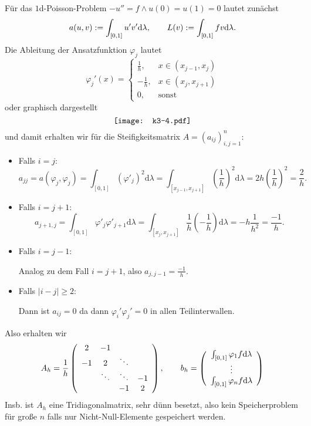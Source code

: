 \documentclass{book}
\newcommand{\assign}{:=}
\newcommand{\mathd}{\mathrm{d}}
\newenvironment{itemizedot}{\begin{itemize} \renewcommand{\labelitemi}{$\bullet$}\renewcommand{\labelitemii}{$\bullet$}\renewcommand{\labelitemiii}{$\bullet$}\renewcommand{\labelitemiv}{$\bullet$}}{\end{itemize}}
\begin{document}
F{\"u}r das $1$d-Poisson-Problem $- u'' = f \wedge u (0) = u (1) = 0$ lautet
zun{\"a}chst
\[ a (u, v) \assign \int_{[0, 1]} u' v' \mathd \lambda, \text{\qquad} L (v)
   \assign \int_{[0, 1]} f v \mathd \lambda . \]
{\hspace{1.7em}}Die Ableitung der Ansatzfunktion $\varphi_j$ lautet
\[ \varphi_j' (x) = \left\{\begin{array}{cc}
     \frac{1}{h}, & x \in (x_{j - 1}, x_j)\\
     - \frac{1}{h}, & x \in (x_j, x_{j + 1})\\
     0, & \text{sonst}
   \end{array}\right. \]
oder graphisch dargestellt
\[ 
   \raisebox{-0.00270170439554641\height}{\texttt{[image: k3-4.pdf]}}
\]
und damit erhalten wir f{\"u}r die Steifigkeitsmatrix $A = (a_{i j})_{i, j =
1}^n$:
\begin{itemizedot}
  \item Falls $i = j$:
  \[ a_{j j} = a (\varphi_j, \varphi_j) = \int_{[0, 1]} (\varphi'_j)^2 \mathd
     \lambda = \int_{[x_{j - 1}, x_{j + 1}]} \left( \frac{1}{h} \right)^2
     \mathd \lambda = 2 h \left( \frac{1}{h} \right)^2 = \frac{2}{h} . \]
  \item Falls $i = j + 1$:
  \[ a_{j + 1, j} = \int_{[0, 1]} \varphi'_j {\varphi'_{j + 1}}  \mathd
     \lambda = \int_{[x_j, x_{j + 1}]} \frac{1}{h} \left( - \frac{1}{h}
     \right) \mathd \lambda = - h \frac{1}{h^2}  = \frac{- 1}{h} . \]
  \item Falls $i = j - 1$:
  
  Analog zu dem Fall $i = j + 1$, also $a_{j, j - 1} = \frac{- 1}{h}$.
  
  \item Falls $| i - j | \geqslant 2$:
  
  Dann ist $a_{i j} = 0$ da dann $\varphi_i' \varphi_j' = 0$ in allen
  Teilinterwallen. 
\end{itemizedot}
Also erhalten wir
\[ A_h = \frac{1}{h} \left(\begin{array}{cccc}
     2 & - 1 &  & \\
     - 1 & 2 & \ddots & \\
     & \ddots & \ddots & - 1\\
     &  & - 1 & 2
   \end{array}\right), \text{\qquad} b_h = \left(\begin{array}{c}
     \int_{[0, 1]} \varphi_1 f \mathd \lambda\\
     \vdots\\
     \int_{[0, 1]} \varphi_n f \mathd \lambda
   \end{array}\right) \]
{\hspace{1.7em}}Insb. ist $A_h$ eine Tridiagonalmatrix, sehr d{\"u}nn besetzt,
also kein Speicherproblem f{\"u}r gro{\ss}e $n$ falls nur Nicht-Null-Elemente
gespeichert werden.
\end{document}

